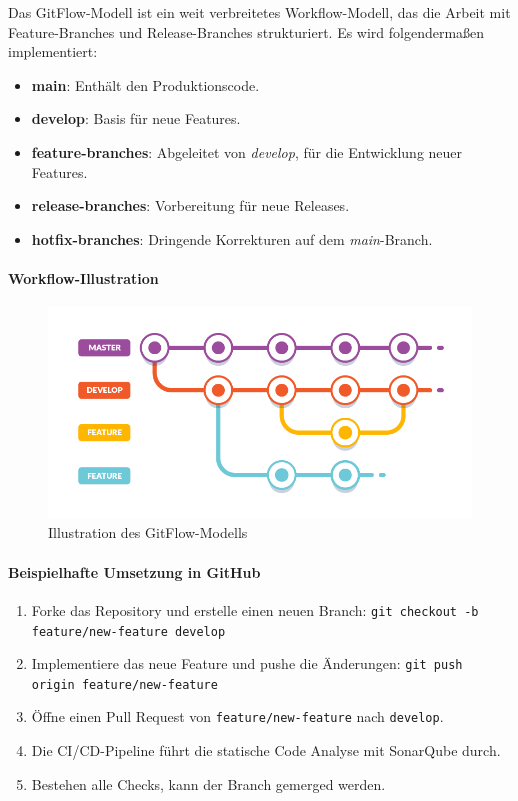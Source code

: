 Das GitFlow-Modell ist ein weit verbreitetes Workflow-Modell, das die Arbeit mit Feature-Branches und Release-Branches strukturiert. Es wird folgendermaßen implementiert:

\begin{itemize}
    \item \textbf{main}: Enthält den Produktionscode.
    \item \textbf{develop}: Basis für neue Features.
    \item \textbf{feature-branches}: Abgeleitet von \textit{develop}, für die Entwicklung neuer Features.
    \item \textbf{release-branches}: Vorbereitung für neue Releases.
    \item \textbf{hotfix-branches}: Dringende Korrekturen auf dem \textit{main}-Branch.
\end{itemize}

\paragraph{Workflow-Illustration}

\begin{figure}[h!]
\centering
\includegraphics[width=\textwidth]{img/gitflow_workflow.png}
\caption{Illustration des GitFlow-Modells}
\label{fig:gitflow}
\end{figure}

\paragraph{Beispielhafte Umsetzung in GitHub}

\begin{enumerate}
    \item Forke das Repository und erstelle einen neuen Branch: \texttt{git checkout -b feature/new-feature develop}
    \item Implementiere das neue Feature und pushe die Änderungen: \texttt{git push origin feature/new-feature}
    \item Öffne einen Pull Request von \texttt{feature/new-feature} nach \texttt{develop}.
    \item Die CI/CD-Pipeline führt die statische Code Analyse mit SonarQube durch.
    \item Bestehen alle Checks, kann der Branch gemerged werden.
\end{enumerate}

